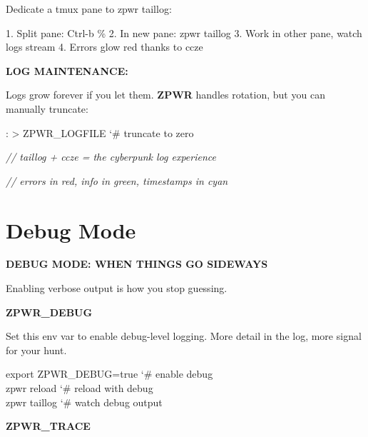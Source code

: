 \documentclass[11pt,a4paper,twoside]{book}
\begin{document}
Dedicate a tmux pane to zpwr taillog:

1. Split pane: Ctrl-b \% 2. In new pane: zpwr taillog 3. Work in other pane, watch logs stream 4. Errors glow red thanks to ccze


\vspace{12pt}
{\bfseries\color{neonyellow} LOG MAINTENANCE:}\vspace{4pt}

Logs grow forever if you let them. \textbf{ZPWR} handles rotation, but you can manually truncate:

\begin{codebox}
\color{neongreen}: > ZPWR\_LOGFILE            {\char`\#} truncate to zero\\
\end{codebox}

{\small\itshape\color{dimtext} // taillog + ccze = the cyberpunk log experience}

{\small\itshape\color{dimtext} // errors in red, info in green, timestamps in cyan}


\vspace{16pt}

\section{Debug Mode}


\vspace{10pt}
{\large\bfseries\color{neoncyan} DEBUG MODE: WHEN THINGS GO SIDEWAYS}\vspace{6pt}

Enabling verbose output is how you stop guessing.


\vspace{12pt}
{\bfseries\color{neonyellow} \textbf{ZPWR\_DEBUG}}\vspace{4pt}

Set this env var to enable debug-level logging. More detail in the log, more signal for your hunt.

\begin{codebox}
\color{neongreen}export ZPWR\_DEBUG=true       {\char`\#} enable debug\\
\color{neongreen}zpwr reload                  {\char`\#} reload with debug\\
\color{neongreen}zpwr taillog                 {\char`\#} watch debug output\\
\end{codebox}


\vspace{12pt}
{\bfseries\color{neonyellow} \textbf{ZPWR\_TRACE}}\vspace{4pt}
\end{document}
